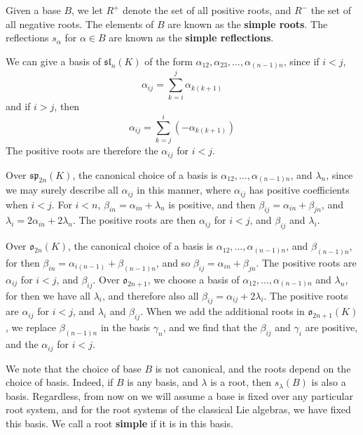 Given a base $B$, we let $R^+$ denote the set of all positive roots, and $R^-$ the set of all negative roots. The elements of $B$ are known as the {\bf simple roots}. The reflections $s_\alpha$ for $\alpha \in B$ are known as the {\bf simple reflections}.

\begin{example}
    We can give a basis of $\mathfrak{sl}_n(K)$ of the form $\alpha_{12}, \alpha_{23}, \dots, \alpha_{(n-1)n}$, since if $i < j$,
    \[ \alpha_{ij} = \sum_{k = i}^j \alpha_{k(k+1)} \]
    and if $i > j$, then
    \[ \alpha_{ij} = \sum_{k = j}^i (-\alpha_{k(k+1)}) \]
    The positive roots are therefore the $\alpha_{ij}$ for $i < j$.
\end{example}

\begin{example}
    Over $\mathfrak{sp}_{2n}(K)$, the canonical choice of a basis is $\alpha_{12}, \dots, \alpha_{(n-1)n}$, and $\lambda_n$, since we may surely describe all $\alpha_{ij}$ in this manner, where $\alpha_{ij}$ has positive coefficients when $i < j$. For $i < n$, $\beta_{in} = \alpha_{in} + \lambda_n$ is positive, and then $\beta_{ij} = \alpha_{in} + \beta_{jn}$, and $\lambda_i = 2 \alpha_{in} + 2\lambda_n$. The positive roots are then $\alpha_{ij}$ for $i < j$, and $\beta_{ij}$ and $\lambda_i$.
\end{example}

\begin{example}
    Over $\mathfrak{o}_{2n}(K)$, the canonical choice of a basis is $\alpha_{12}, \dots, \alpha_{(n-1)n}$, and $\beta_{(n-1)n}$, for then $\beta_{in} = \alpha_{i(n-1)} + \beta_{(n-1)n}$, and so $\beta_{ij} = \alpha_{in} + \beta_{jn}$. The positive roots are $\alpha_{ij}$ for $i < j$, and $\beta_{ij}$. Over $\mathfrak{o}_{2n+1}$, we choose a basis of $\alpha_{12}, \dots, \alpha_{(n-1)n}$ and $\lambda_n$, for then we have all $\lambda_i$, and therefore also all $\beta_{ij} = \alpha_{ij} + 2 \lambda_i$. The positive roots are $\alpha_{ij}$ for $i < j$, and $\lambda_i$ and $\beta_{ij}$. When we add the additional roots in $\mathfrak{o}_{2n+1}(K)$, we replace $\beta_{(n-1)n}$ in the basis $\gamma_n$, and we find that the $\beta_{ij}$ and $\gamma_i$ are positive, and the $\alpha_{ij}$ for $i < j$.
\end{example}

We note that the choice of base $B$ is not canonical, and the roots depend on the choice of basis. Indeed, if $B$ is any basis, and $\lambda$ is a root, then $s_\lambda(B)$ is also a basis. Regardless, from now on we will assume a base is fixed over any particular root system, and for the root systems of the classical Lie algebras, we have fixed this basis. We call a root {\bf simple} if it is in this basis.

